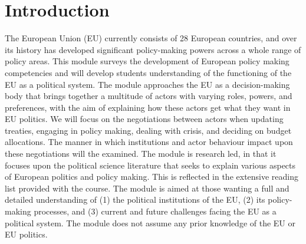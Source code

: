
\section*{Introduction}

	The European Union (EU) currently consists of 28 European countries, and over its history has developed significant policy-making powers across a whole range of policy areas. This module surveys the development of European policy making competencies and will develop students understanding of the functioning of the EU as a political system. The module approaches the EU as a decision-making body that brings together a multitude of actors with varying roles, powers, and preferences, with the aim of explaining how these actors get what they want in EU politics. We will focus on the negotiations between actors when updating treaties, engaging in policy making, dealing with crisis, and deciding on budget allocations. The manner in which institutions and actor behaviour impact upon these negotiations will the examined. The module is research led, in that it focuses upon the political science literature that seeks to explain various aspects of European politics and policy making. This is reflected in the extensive reading list provided with the course. The module is aimed at those wanting a full and detailed understanding of (1) the political institutions of the EU, (2) its policy-making processes, and (3) current and future challenges facing the EU as a political system. The module does not assume any prior knowledge of the EU or EU politics.